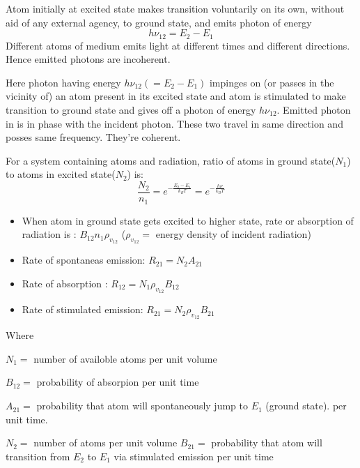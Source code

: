 \documentclass[12pt, a4paper]{article}
\begin{document}

Atom initially at excited state makes transition voluntarily on its own, without aid of any external agency, to ground state, and emits photon of energy $$h \nu_{12}=E_2-E_1$$
Different atoms of medium emits light at different times and different directions. Hence emitted photons are incoherent.

Here photon having energy $h\nu_{12}(=E_2-E_1)$ impinges on (or passes in the vicinity of) an atom present in its excited state and atom is stimulated to make transition to ground state and gives off a photon of energy $h \nu_{12}$. Emitted photon in is in phase with the incident photon. These two travel in same direction and posses same frequency. They're coherent.

For a system containing atoms and radiation, ratio of atoms in ground state($N_1$) to atoms in excited state($N_2$) is:
$$
	\frac{N_2}{n_1}=e^{-\frac{E_2-E_1}{k_B T}} = e^{-\frac{h \nu}{k_B T}}
$$
\begin{itemize}
	\item When atom in ground state gets excited to higher state, rate or absorption of radiation is : $B_{12} n_1 \rho_{v_{12}}$ ($\rho_{v_{12}}=$ energy density of incident radiation)
	\item Rate of spontaneas emission: $R_{21}=N_2 A_{21}$
	\item Rate of absorption : $R_{12}=N_1 \rho_{v_{12}} B_{12}$
	\item Rate of stimulated emission: $R_{21}=N_2 \rho_{v_{12}} B_{21}$
\end{itemize}
Where

$N_1=$ number of availoble atoms per unit volume

$B_{12}=$ probability of absorpion per unit time

$A_{21}=$ probability that atom will spontaneously jump to $E_1$ (ground state). per unit time.

$N_2 =$ number of atoms per unit volume
$B_{21}=$ probability that atom will transition from $E_2$ to $E_1$ via stimulated emission per unit time
\end{document}
